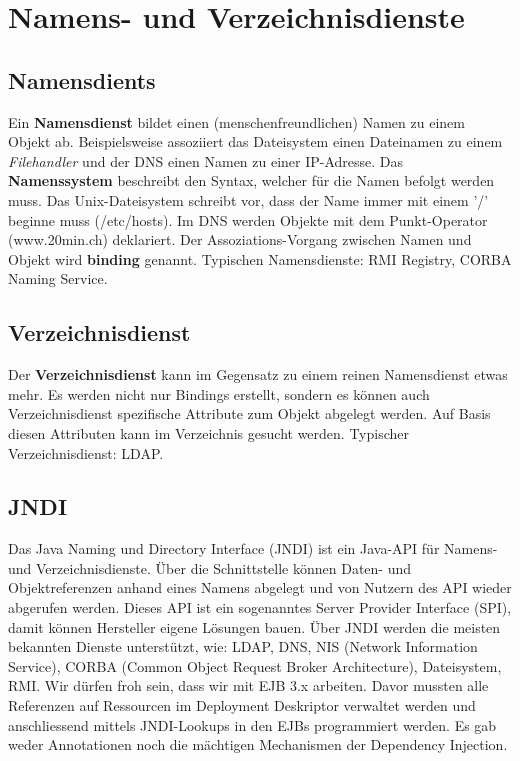 \chapter{Namens- und Verzeichnisdienste}

\section{Namensdients}
Ein \textbf{Namensdienst} bildet einen (menschenfreundlichen) Namen zu einem Objekt ab. Beispielsweise assoziiert das Dateisystem einen Dateinamen zu einem \emph{Filehandler} und der DNS einen Namen zu einer IP-Adresse. Das \textbf{Namenssystem} beschreibt den Syntax, welcher für die Namen befolgt werden muss. Das Unix-Dateisystem schreibt vor, dass der Name immer mit einem '/' beginne muss (/etc/hosts). Im DNS werden Objekte mit dem Punkt-Operator (www.20min.ch) deklariert. Der Assoziations-Vorgang zwischen Namen und Objekt wird \textbf{binding} genannt. Typischen Namensdienste: RMI Registry, CORBA Naming Service.

\section{Verzeichnisdienst}
Der \textbf{Verzeichnisdienst} kann im Gegensatz zu einem reinen Namensdienst etwas mehr. Es werden nicht nur Bindings erstellt, sondern es können auch Verzeichnisdienst spezifische Attribute zum Objekt abgelegt werden. Auf Basis diesen Attributen kann im Verzeichnis gesucht werden. Typischer Verzeichnisdienst: LDAP.

\section{JNDI}
Das Java Naming und Directory Interface (JNDI) ist ein Java-API für Namens- und Verzeichnisdienste. Über die Schnittstelle können Daten- und Objektreferenzen anhand eines Namens abgelegt und von Nutzern des API wieder abgerufen werden. Dieses API ist ein sogenanntes Server Provider Interface (SPI), damit können Hersteller eigene Lösungen bauen. Über JNDI werden die meisten bekannten Dienste unterstützt, wie: LDAP, DNS, NIS (Network Information Service), CORBA (Common Object Request Broker Architecture), Dateisystem, RMI. Wir dürfen froh sein, dass wir mit EJB 3.x arbeiten. Davor mussten alle Referenzen auf Ressourcen im Deployment Deskriptor verwaltet werden und anschliessend mittels JNDI-Lookups in den EJBs programmiert werden. Es gab weder Annotationen noch die mächtigen Mechanismen der Dependency Injection.

